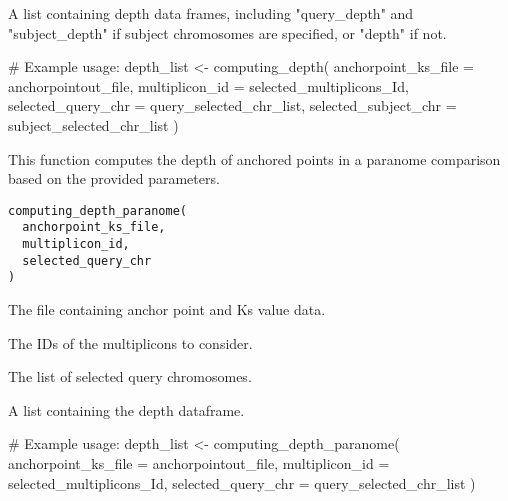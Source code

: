 \documentclass[a4paper]{book}
\begin{document}
%
\begin{Value}
A list containing depth data frames, including "query\_depth" and "subject\_depth" if subject chromosomes are specified, or "depth" if not.
\end{Value}
%
\begin{Examples}
\begin{ExampleCode}
# Example usage:
depth_list <- computing_depth(
    anchorpoint_ks_file = anchorpointout_file,
    multiplicon_id = selected_multiplicons_Id,
    selected_query_chr = query_selected_chr_list,
    selected_subject_chr = subject_selected_chr_list
)
\end{ExampleCode}
\end{Examples}
%
\begin{Description}\relax
This function computes the depth of anchored points in a paranome comparison based on the provided parameters.
\end{Description}
%
\begin{Usage}
\begin{verbatim}
computing_depth_paranome(
  anchorpoint_ks_file,
  multiplicon_id,
  selected_query_chr
)
\end{verbatim}
\end{Usage}
%
\begin{Arguments}
\begin{ldescription}
\item[\code{anchorpoint\_ks\_file}] The file containing anchor point and Ks value data.

\item[\code{multiplicon\_id}] The IDs of the multiplicons to consider.

\item[\code{selected\_query\_chr}] The list of selected query chromosomes.
\end{ldescription}
\end{Arguments}
%
\begin{Value}
A list containing the depth dataframe.
\end{Value}
%
\begin{Examples}
\begin{ExampleCode}
# Example usage:
depth_list <- computing_depth_paranome(
    anchorpoint_ks_file = anchorpointout_file,
    multiplicon_id = selected_multiplicons_Id,
    selected_query_chr = query_selected_chr_list
)

\end{ExampleCode}
\end{Examples}
\end{document}
